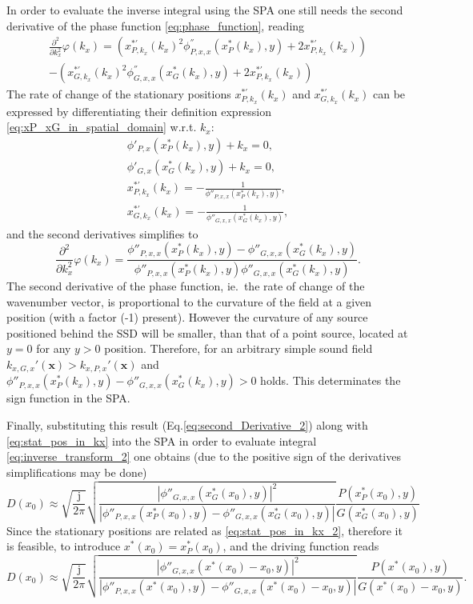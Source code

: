 \documentclass[12pt,a4paper]{article}
\newcommand{\ti}{\mathrm{j}}
\newcommand{\vx}{\mathbf{x}}
\begin{document}
In order to evaluate the inverse integral using the SPA one still needs the second derivative of the phase function \eqref{eq:phase_function}, reading
\begin{multline}
\frac{\partial^2}{\partial k_x^2} \varphi(k_x) = 
 \left( x^{*'}_{P,k_x}(k_x)^2 \phi_{P,x,x}^{''}(x^*_P (k_x),y)  + 2 x^{*'}_{P,k_x}(k_x)\right) 
\\
-\left( x^{*'}_{G,k_x}(k_x)^2 \phi_{G,x,x}^{''}(x^*_G(k_x),y)  +  2 x^{*'}_{P,k_x}(k_x)\right) 
\label{eq:second_Derivative}
\end{multline}
The rate of change of the stationary positions $ x^{*'}_{P,k_x}(k_x)$ and $ x^{*'}_{G,k_x}(k_x)$ can be expressed by differentiating their definition expression \eqref{eq:xP_xG_in_spatial_domain} w.r.t. $k_x$:
\begin{eqnarray}
\phi'_{P,x}(x^*_P(k_x),y) + k_x = 0, \\
\phi'_{G,x}(x^*_G(k_x),y) + k_x = 0, \\
x^{*'}_{P,k_x}(k_x) = -\frac{1}{ \phi{''}_{P,x,x}(x^*_P(k_x),y) }, \\
x^{*'}_{G,k_x}(k_x) = -\frac{1}{ \phi{''}_{G,x,x}(x^*_G(k_x),y) }, 
\end{eqnarray}
and the second derivatives simplifies to
\begin{equation}
\frac{\partial^2}{\partial k_x^2} \varphi(k_x) = \frac{ \phi{''}_{P,x,x}(x^*_P(k_x),y) - \phi{''}_{G,x,x}(x^*_G(k_x),y)}{\phi{''}_{P,x,x}(x^*_P(k_x),y) \phi{''}_{G,x,x}(x^*_G(k_x),y)}.
\label{eq:second_Derivative_2}
\end{equation}
The second derivative of the phase function, ie.\ the rate of change of the wavenumber vector, is proportional to the curvature of the field at a given position (with a factor (-1) present).
However the curvature of any source positioned behind the SSD will be smaller, than that of a point source, located at $y = 0$ for any $y>0$ position.
Therefore, for an arbitrary simple sound field $k_{x,G,x}'(\vx) > k_{x,P,x}'(\vx)$ and $\phi{''}_{P,x,x}(x^*_P(k_x),y) - \phi{''}_{G,x,x}(x^*_G(k_x),y) >0$ holds.
This determinates the sign function in the SPA.

Finally, substituting this result (Eq.\eqref{eq:second_Derivative_2}) along with \eqref{eq:stat_pos_in_kx} into the SPA in order to evaluate integral \eqref{eq:inverse_transform_2} one obtains (due to the positive sign of the derivatives simplifications may be done)
\begin{equation}
D(x_0) \approx
\sqrt{\frac{\ti}{2\pi}} 
\sqrt{\frac{ \left| \phi{''}_{G,x,x}(x^*_G(x_0),y )\right|^2}{\left| \phi{''}_{P,x,x}(x^*_P(x_0),y) - \phi{''}_{G,x,x}(x^*_G(x_0),y)\right|}}
\frac{P(x^*_P(x_0),y)}{G(x^*_G(x_0),y)}
\end{equation}
Since the stationary positions are related as \eqref{eq:stat_pos_in_kx_2}, therefore it is feasible, to introduce $x^*(x_0) = x^*_P(x_0)$, and the driving function reads
\begin{equation}
D(x_0) \approx
\sqrt{\frac{\ti}{2\pi}} 
\sqrt{\frac{ \left| \phi{''}_{G,x,x}(x^*(x_0)-x_0,y )\right|^2}{\left| \phi{''}_{P,x,x}(x^*(x_0),y) - \phi{''}_{G,x,x}(x^*(x_0) - x_0,y)\right|}}
\frac{P(x^*(x_0),y)}{G(x^*(x_0) - x_0,y)}.
\end{equation}
\end{document}
